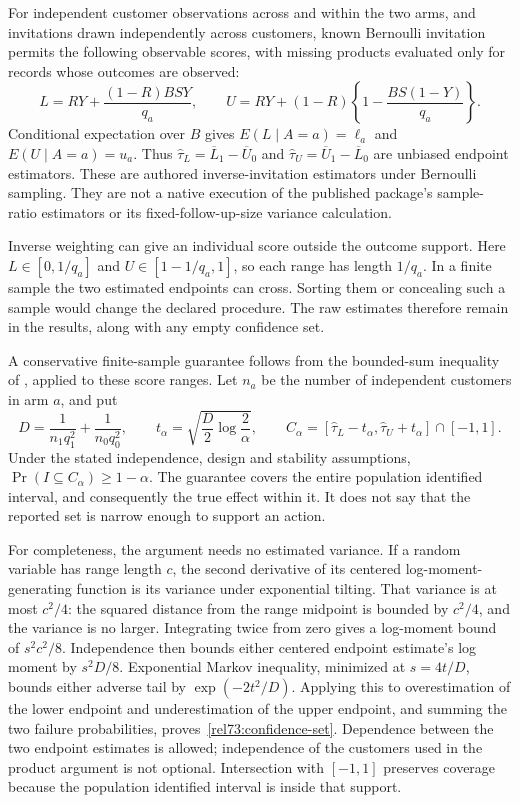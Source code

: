 For independent customer observations across and within the two arms,
and invitations drawn independently across customers, known Bernoulli
invitation permits
the following observable scores, with missing products evaluated only for
records whose outcomes are observed:
\begin{equation}
 L=RY+\frac{(1-R)BSY}{q_a},\qquad
 U=RY+(1-R)\left\{1-\frac{BS(1-Y)}{q_a}\right\}.
 \label{rel73:endpoint-scores}
\end{equation}
Conditional expectation over $B$ gives $E(L\mid A=a)=\ell_a$ and
$E(U\mid A=a)=u_a$. Thus
$\widehat\tau_L=\overline L_1-\overline U_0$ and
$\widehat\tau_U=\overline U_1-\overline L_0$ are unbiased endpoint
estimators. These are authored inverse-invitation estimators under Bernoulli
sampling. They are not a native execution of the published package's
sample-ratio estimators or its fixed-follow-up-size variance calculation.

Inverse weighting can give an individual score outside the outcome support.
Here $L\in[0,1/q_a]$ and $U\in[1-1/q_a,1]$, so each range has length
$1/q_a$. In a finite sample the two estimated endpoints can cross. Sorting
them or concealing such a sample would change the declared procedure. The
raw estimates therefore remain in the results, along with any empty
confidence set.

A conservative finite-sample guarantee follows from the bounded-sum inequality of \citet[Theorem 2]{closure30hoeffding}, applied to these score ranges. Let $n_a$ be the number of independent customers in arm $a$, and put
\begin{equation}
 D=\frac{1}{n_1q_1^2}+\frac{1}{n_0q_0^2},\qquad
 t_\alpha=\sqrt{\frac{D}{2}\log\frac{2}{\alpha}},\qquad
 C_\alpha=[\widehat\tau_L-t_\alpha,
            \widehat\tau_U+t_\alpha]\cap[-1,1].
 \label{rel73:confidence-set}
\end{equation}
Under the stated independence, design and stability assumptions,
$\Pr(I\subseteq C_\alpha)\geq1-\alpha$. The guarantee covers the entire
population identified interval, and consequently the true effect within it.
It does not say that the reported set is narrow enough to support an action.

For completeness, the argument needs no estimated variance. If a random
variable has range length $c$, the second derivative of its centered
log-moment-generating function is its variance under exponential tilting.
That variance is at most $c^2/4$: the squared distance from the range
midpoint is bounded by $c^2/4$, and the variance is no larger. Integrating
twice from zero gives a log-moment bound of $s^2c^2/8$. Independence then
bounds either centered endpoint estimate's log moment by $s^2D/8$.
Exponential Markov inequality, minimized at $s=4t/D$, bounds either adverse
tail by $\exp(-2t^2/D)$. Applying this to overestimation of the lower endpoint
and underestimation of the upper endpoint, and summing the two failure
probabilities, proves~\eqref{rel73:confidence-set}. Dependence between the
two endpoint estimates is allowed; independence of the customers used in
the product argument is not optional. Intersection with $[-1,1]$ preserves
coverage because the population identified interval is inside that support.

